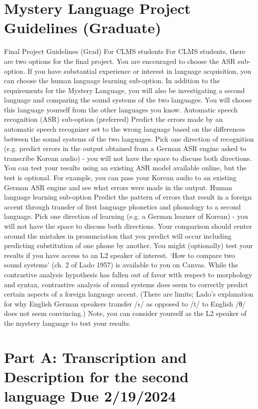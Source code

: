 \documentclass[12pt]{article}
\begin{document}
\section*{Mystery Language Project Guidelines (Graduate)}
Final Project Guidelines (Grad)
For CLMS students
For CLMS students, there are two options for the final project. You are encouraged to choose the ASR sub-option. If you have substantial experience or interest in language acquisition, you can choose the human language learning sub-option.
In addition to the requirements for the Mystery Language, you will also be investigating a second language and comparing the sound systems of the two languages. You will choose this language yourself from the other languages you know.
Automatic speech recognition (ASR) sub-option (preferred)
Predict the errors made by an automatic speech recognizer set to the wrong language based on the differences between the sound systems of the two languages. Pick one direction of recognition (e.g.
predict errors in the output obtained from a German ASR engine asked to transcribe Korean audio) - you will not have the space to discuss both directions. You can test your results using an existing ASR model available online, but the test is optional. For example, you can pass your Korean audio to an existing German ASR engine and see what errors were made in the output.
Human language learning sub-option
Predict the pattern of errors that result in a foreign accent through transfer of first language phonetics and phonology to a second language. Pick one direction of learning (e.g. a German learner of Korean) - you will not have the space to discuss both directions. Your comparison should center around the mistakes in pronunciation that you predict will occur including predicting substitution of one phone by another. You might (optionally) test your results if you have access to an L2 speaker of interest.  ‘How to compare two sound systems’ (ch. 2 of Lado 1957) is available to you on Canvas. While the contrastive analysis hypothesis has fallen out of favor with respect to morphology and syntax, contrastive analysis of sound systems does seem to correctly predict certain aspects of a foreign language accent. (There are limits; Lado’s explanation for why English German speakers transfer /s/ as opposed to /t/ to English /θ/ does not seem convincing.) Note, you can consider yourself as the L2 speaker of the mystery language to test your results.
\section*{Part A:  Transcription and Description for the second language Due 2/19/2024}
\end{document}

